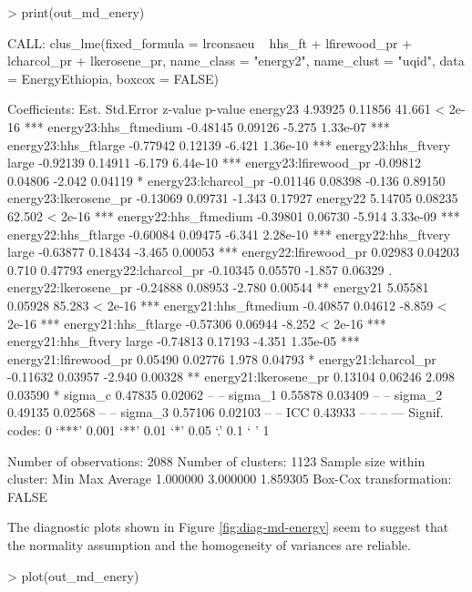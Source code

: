 \begin{example}
> print(out_md_enery)

CALL: clus_lme(fixed_formula = lrconsaeu ~ hhs_ft + lfirewood_pr + 
    lcharcol_pr + lkerosene_pr, name_class = "energy2", name_clust = "uqid", 
    data = EnergyEthiopia, boxcox = FALSE)
 
Coefficients:
                              Est. Std.Error z-value  p-value    
energy23                   4.93925   0.11856  41.661  < 2e-16 ***
energy23:hhs_ftmedium     -0.48145   0.09126  -5.275 1.33e-07 ***
energy23:hhs_ftlarge      -0.77942   0.12139  -6.421 1.36e-10 ***
energy23:hhs_ftvery large -0.92139   0.14911  -6.179 6.44e-10 ***
energy23:lfirewood_pr     -0.09812   0.04806  -2.042  0.04119 *  
energy23:lcharcol_pr      -0.01146   0.08398  -0.136  0.89150    
energy23:lkerosene_pr     -0.13069   0.09731  -1.343  0.17927    
energy22                   5.14705   0.08235  62.502  < 2e-16 ***
energy22:hhs_ftmedium     -0.39801   0.06730  -5.914 3.33e-09 ***
energy22:hhs_ftlarge      -0.60084   0.09475  -6.341 2.28e-10 ***
energy22:hhs_ftvery large -0.63877   0.18434  -3.465  0.00053 ***
energy22:lfirewood_pr      0.02983   0.04203   0.710  0.47793    
energy22:lcharcol_pr      -0.10345   0.05570  -1.857  0.06329 .  
energy22:lkerosene_pr     -0.24888   0.08953  -2.780  0.00544 ** 
energy21                   5.05581   0.05928  85.283  < 2e-16 ***
energy21:hhs_ftmedium     -0.40857   0.04612  -8.859  < 2e-16 ***
energy21:hhs_ftlarge      -0.57306   0.06944  -8.252  < 2e-16 ***
energy21:hhs_ftvery large -0.74813   0.17193  -4.351 1.35e-05 ***
energy21:lfirewood_pr      0.05490   0.02776   1.978  0.04793 *  
energy21:lcharcol_pr      -0.11632   0.03957  -2.940  0.00328 ** 
energy21:lkerosene_pr      0.13104   0.06246   2.098  0.03590 *  
sigma_c                    0.47835   0.02062      --       --    
sigma_1                    0.55878   0.03409      --       --    
sigma_2                    0.49135   0.02568      --       --    
sigma_3                    0.57106   0.02103      --       --    
ICC                        0.43933        --      --       --    
---
Signif. codes:  0 ‘***’ 0.001 ‘**’ 0.01 ‘*’ 0.05 ‘.’ 0.1 ‘ ’ 1

Number of observations: 2088 
Number of clusters: 1123 
Sample size within cluster:
     Min      Max  Average 
1.000000 3.000000 1.859305 
Box-Cox transformation: FALSE
\end{example}
The diagnostic plots shown in Figure \ref{fig:diag-md-energy} seem to suggest that the normality assumption and the homogeneity of variances are reliable.
\begin{example}
> plot(out_md_enery)
\end{example}

